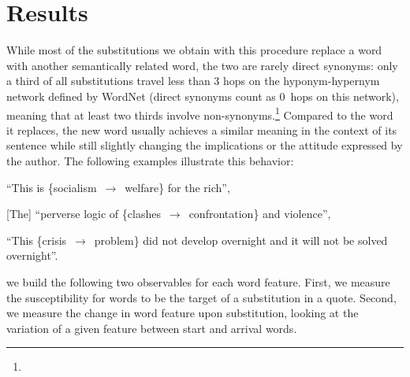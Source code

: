 \section{Results}\label{sec:results}

\begin{new}

While most of the substitutions we obtain with this procedure replace a word with another semantically related word, the two are rarely direct synonyms:
only a third of all substitutions travel less than 3 hops on the hyponym-hypernym network defined by WordNet (direct synonyms count as 0~hops on this network), meaning that at least two thirds involve non-synonyms.\footnote{
}
Compared to the word it replaces, the new word usually achieves a similar meaning in the context of its sentence while still slightly changing the implications or the attitude expressed by the author.
The following examples illustrate this behavior:

\begin{APAitemize}
	\item ``This is \{socialism~$\rightarrow$~welfare\} for the rich'',
	\item {[}The{]} ``perverse logic of \{clashes~$\rightarrow$~confrontation\} and violence'',
	\item ``This \{crisis~$\rightarrow$~problem\} did not develop overnight and it will not be solved overnight''.
\end{APAitemize}

\end{new}

 we build the following two observables for each word feature.
First, we measure  the susceptibility for words to be the target of a substitution in a quote.
Second, we measure the change in word feature upon substitution, looking at the variation of a given feature between start and arrival words.

